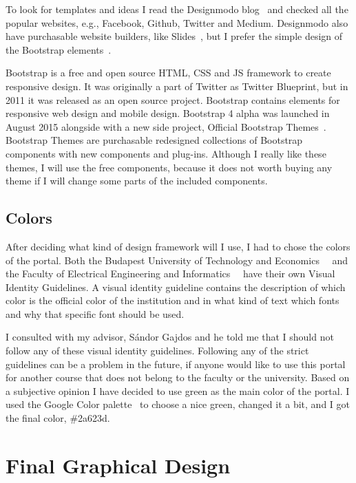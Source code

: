 To look for templates and ideas I read the Designmodo blog~\cite{Designmodo} and checked all the popular websites, e.g., Facebook, Github, Twitter and Medium. Designmodo also have purchasable website builders, like Slides~\cite{Designmodo-slides}, but I prefer the simple design of the Bootstrap elements~\cite{Bootstrap}. 

Bootstrap is a free and open source HTML, CSS and JS framework to create responsive design. It was originally a part of Twitter as Twitter Blueprint, but in 2011 it was released as an open source project. Bootstrap contains elements for responsive web design and mobile design. Bootstrap 4 alpha was launched in August 2015 alongside with a new side project, Official Bootstrap Themes~\cite{Bootstrap-themes}. Bootstrap Themes are purchasable redesigned collections of Bootstrap components with new components and plug-ins. Although I really like these themes, I will use the free components, because it does not worth buying any theme if I will change some parts of the included components. 

\subsection{Colors}

After deciding what kind of design framework will I use, I had to chose the colors of the portal. Both the Budapest University of Technology and Economics~\cite{BME-Arculat}~\cite{BME-Arculat-Intranet} and the Faculty of Electrical Engineering and Informatics~\cite{VIK-Arculat}~\cite{VIK-Arculat-PDF} have their own Visual Identity Guidelines. A visual identity guideline contains the description of which color is the official color of the institution and in what kind of text which fonts and why that specific font should be used.

I consulted with my advisor, Sándor Gajdos and he told me that I should not follow any of these visual identity guidelines. Following any of the strict guidelines can be a problem in the future, if anyone would like to use this portal for another course that does not belong to the faculty or the university. Based on a subjective opinion I have decided to use green as the main color of the portal. I used the Google Color palette~\cite{google-color-chart} to choose a nice green, changed it a bit, and I got the final color, \#2a623d.

\newpage
\section{Final Graphical Design}

